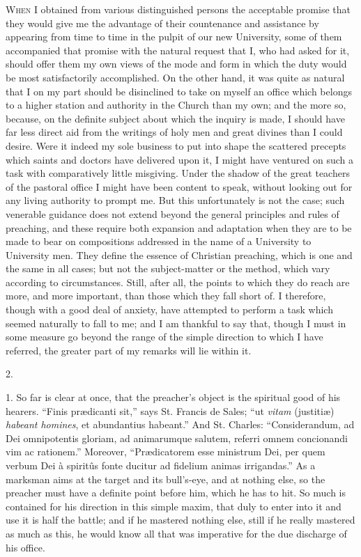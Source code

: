 W\textsc{hen} I obtained from various distinguished persons the
acceptable promise that they would give me the advantage of their
countenance and assistance by appearing from time to time in the
pulpit of our new University, some of them accompanied that promise
with the natural request that I, who had asked for it, should offer
them my own views of the mode and form in which the duty would be most
satisfactorily accomplished. On the other hand, it was quite as
natural that I on my part should be disinclined to take on myself an
office which belongs to a higher station and authority in the Church
than my own; and the more so, because, on the definite subject about
which the inquiry is made, I should have far less direct aid from the
writings of holy men and great divines than I could desire. Were it
indeed my sole business to put into shape the scattered precepts which
saints and doctors have delivered upon it, I might have ventured on
such a task with comparatively little misgiving. Under the shadow of
the great teachers of the pastoral office I might have been content to
speak, without looking out for any living authority to prompt me. But
this unfortunately is not the case; such venerable guidance does not
extend beyond the general principles and rules of preaching, and
these require both expansion and adaptation when they are to be made
to bear on compositions addressed in the name of a University to
University men. They define the essence of Christian preaching, which
is one and the same in all cases; but not the subject-matter or the
method, which vary according to circumstances. Still, after all, the
points to which they do reach are more, and more important, than those
which they fall short of. I therefore, though with a good deal of
anxiety, have attempted to perform a task which seemed naturally to
fall to me; and I am thankful to say that, though I must in some
measure go beyond the range of the simple direction to which I have
referred, the greater part of my remarks will lie within it.

2.

1. So far is clear at once, that the preacher's object is the
spiritual good of his hearers. ``Finis prædicanti sit,'' says
St. Francis de Sales; ``ut \emph{vitam} (justitiæ) \emph{habeant
homines}, et abundantius habeant.'' And St. Charles: ``Considerandum,
ad Dei omnipotentis gloriam, ad animarumque salutem, referri omnem
concionandi vim ac rationem.'' Moreover, ``Prædicatorem esse
ministrum Dei, per quem verbum Dei à spiritûs fonte ducitur ad
fidelium animas irrigandas.'' As a marksman aims at the target and
its bull's-eye, and at nothing else, so the preacher must have a
definite point before him, which he has to hit. So much is contained
for his direction in this simple maxim, that duly to enter into it and
use it is half the battle; and if he mastered nothing else, still if
he really mastered as much as this, he would know all that was
imperative for the due discharge of his office.

